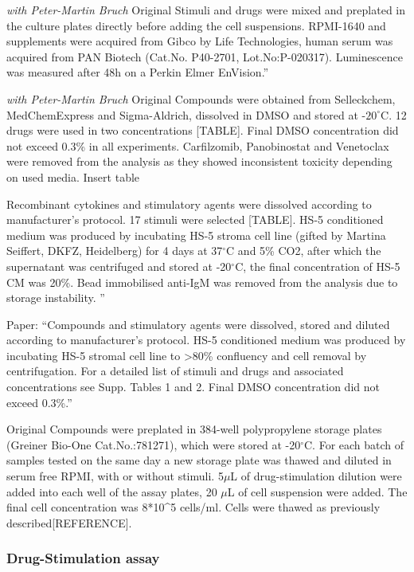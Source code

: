 \documentclass[11pt, a4paper, twosided]{book}
\begin{document}
\emph{with Peter-Martin Bruch} Original
Stimuli and drugs were mixed and preplated in the culture plates directly before adding the cell suspensions. RPMI-1640 and supplements were acquired from Gibco by Life Technologies, human serum was acquired from PAN Biotech (Cat.No. P40-2701, Lot.No:P-020317). Luminescence was measured after 48h on a Perkin Elmer EnVision.''

\emph{with Peter-Martin Bruch} Original
Compounds were obtained from Selleckchem, MedChemExpress and Sigma-Aldrich, dissolved in DMSO and stored at -\(20^\circ\)C. 12 drugs were used in two concentrations {[}TABLE{]}. Final DMSO concentration did not exceed 0.3\% in all experiments. Carfilzomib, Panobinostat and Venetoclax were removed from the analysis as they showed inconsistent toxicity depending on used media.
Insert table

Recombinant cytokines and stimulatory agents were dissolved according to manufacturer's protocol. 17 stimuli were selected {[}TABLE{]}. HS-5 conditioned medium was produced by incubating HS-5 stroma cell line (gifted by Martina Seiffert, DKFZ, Heidelberg) for 4 days at 37\(^\circ\)C and 5\% CO2, after which the supernatant was centrifuged and stored at -20\(^\circ\)C, the final concentration of HS-5 CM was 20\%. Bead immobilised anti-IgM was removed from the analysis due to storage instability. ''

Paper:
``Compounds and stimulatory agents were dissolved, stored and diluted according to manufacturer's protocol. HS-5 conditioned medium was produced by incubating HS-5 stromal cell line to \textgreater80\% confluency and cell removal by centrifugation. For a detailed list of stimuli and drugs and associated concentrations see Supp. Tables 1 and 2. Final DMSO concentration did not exceed 0.3\%.''

Original
Compounds were preplated in 384-well polypropylene storage plates (Greiner Bio-One Cat.No.:781271), which were stored at -20\(^\circ\)C. For each batch of samples tested on the same day a new storage plate was thawed and diluted in serum free RPMI, with or without stimuli. 5\(\mu\)L of drug-stimulation dilution were added into each well of the assay plates, 20 \(\mu\)L of cell suspension were added. The final cell concentration was 8*10\^{}5 cells/ml. Cells were thawed as previously described{[}REFERENCE{]}.

\hypertarget{drug-stimulation-assay}{%
\subsubsection{Drug-Stimulation assay}\label{drug-stimulation-assay}}
\end{document}

